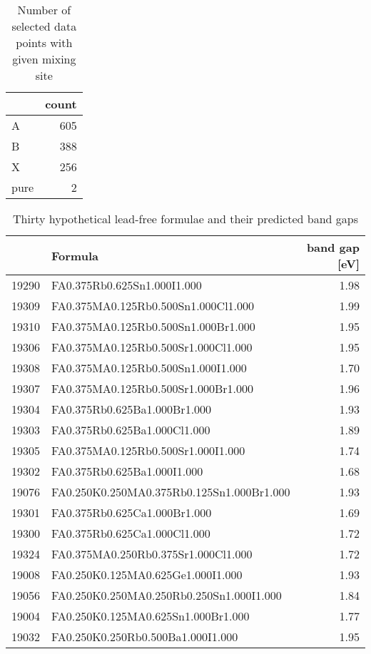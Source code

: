  
\begin{table}[htbp]
\caption{\label{tbl:mixscreen} Number of selected data points with given mixing site}
\centering
\begin{tabular}{lr}
 & count\\[0pt]
\hline
A & 605\\[0pt]
B & 388\\[0pt]
X & 256\\[0pt]
pure & 2\\[0pt]
\end{tabular}
\end{table}

 
\begin{table}[htbp]
\caption{\label{tbl:pbfree} Thirty hypothetical lead-free formulae and their predicted band gaps}
\centering
\begin{tabular}{rlr}
 & Formula & band gap [eV]\\[0pt]
\hline
19290 & FA0.375Rb0.625Sn1.000I1.000 & 1.98\\[0pt]
19309 & FA0.375MA0.125Rb0.500Sn1.000Cl1.000 & 1.99\\[0pt]
19310 & FA0.375MA0.125Rb0.500Sn1.000Br1.000 & 1.95\\[0pt]
19306 & FA0.375MA0.125Rb0.500Sr1.000Cl1.000 & 1.95\\[0pt]
19308 & FA0.375MA0.125Rb0.500Sn1.000I1.000 & 1.70\\[0pt]
19307 & FA0.375MA0.125Rb0.500Sr1.000Br1.000 & 1.96\\[0pt]
19304 & FA0.375Rb0.625Ba1.000Br1.000 & 1.93\\[0pt]
19303 & FA0.375Rb0.625Ba1.000Cl1.000 & 1.89\\[0pt]
19305 & FA0.375MA0.125Rb0.500Sr1.000I1.000 & 1.74\\[0pt]
19302 & FA0.375Rb0.625Ba1.000I1.000 & 1.68\\[0pt]
19076 & FA0.250K0.250MA0.375Rb0.125Sn1.000Br1.000 & 1.93\\[0pt]
19301 & FA0.375Rb0.625Ca1.000Br1.000 & 1.69\\[0pt]
19300 & FA0.375Rb0.625Ca1.000Cl1.000 & 1.72\\[0pt]
19324 & FA0.375MA0.250Rb0.375Sr1.000Cl1.000 & 1.72\\[0pt]
19008 & FA0.250K0.125MA0.625Ge1.000I1.000 & 1.93\\[0pt]
19056 & FA0.250K0.250MA0.250Rb0.250Sn1.000I1.000 & 1.84\\[0pt]
19004 & FA0.250K0.125MA0.625Sn1.000Br1.000 & 1.77\\[0pt]
19032 & FA0.250K0.250Rb0.500Ba1.000I1.000 & 1.95\\[0pt]

\end{tabular}
\end{table}
